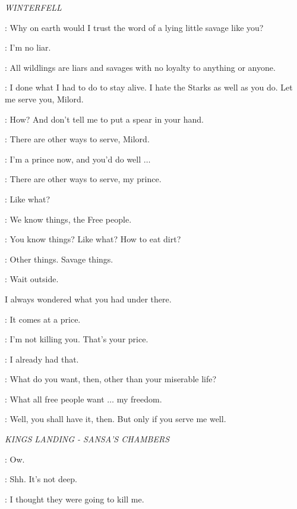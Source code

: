 \scene

\textit{WINTERFELL} 


\THEON: Why on earth would I trust the word of a lying little savage like you? 

\OSHA: I'm no liar. 

\THEON: All wildlings are liars and savages with no loyalty to anything or anyone. 

\OSHA: I done what I had to do to stay alive. I hate the Starks as well as you do. Let me serve you, Milord. 

\THEON: How? And don't tell me to put a spear in your hand. 

\OSHA: There are other ways to serve, Milord. 

\THEON: I'm a prince now, and you'd do well $\ldots$  

\OSHA: There are other ways to serve, my prince. 

\THEON: Like what? 

\OSHA: We know things, the Free people. 

\THEON: You know things? Like what? How to eat dirt? 

\OSHA: Other things. Savage things.


\THEON:  Wait outside.


I always wondered what you had under there. 

\OSHA: It comes at a price. 

\THEON: I'm not killing you. That's your price. 

\OSHA: I already had that. 

\THEON: What do you want, then, other than your miserable life? 

\OSHA: What all free people want $\ldots$ my freedom. 

\THEON: Well, you shall have it, then. But only if you serve me well. 


\scene

\textit{KINGS LANDING - SANSA'S CHAMBERS}


\SANSA: Ow. 

\SHAE: Shh. It's not deep. 

\SANSA: I thought they were going to kill me. 

